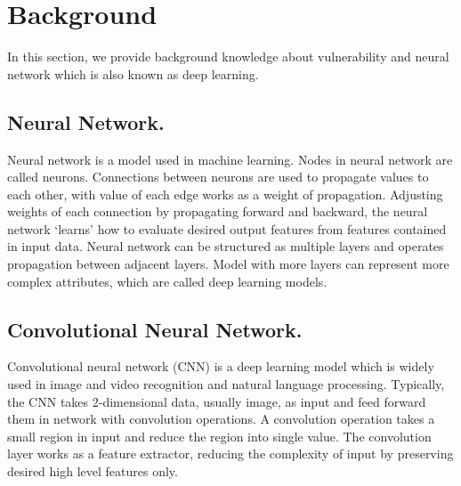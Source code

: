 \section{Background}
\label{section:background}

In this section, we provide background knowledge about vulnerability and neural network which is also known as deep learning.

\subsection{Neural Network.}
Neural network is a model used in machine learning. Nodes in neural network are called neurons.
Connections between neurons are used to propagate values to each other, with value of each edge works as a weight of propagation.
Adjusting weights of each connection by propagating forward and backward, the neural network `learns' how to evaluate desired output features from features contained in input data.
Neural network can be structured as multiple layers and operates propagation between adjacent layers.
Model with more layers can represent more complex attributes, which are called deep learning models.

\subsection{Convolutional Neural Network.}
Convolutional neural network (CNN) is a deep learning model which is widely used in image and video recognition and natural language processing.
Typically, the CNN takes 2-dimensional data, usually image, as input and feed forward them in network with convolution operations.
A convolution operation takes a small region in input and reduce the region into single value.
The convolution layer works as a feature extractor, reducing the complexity of input by preserving desired high level features only.